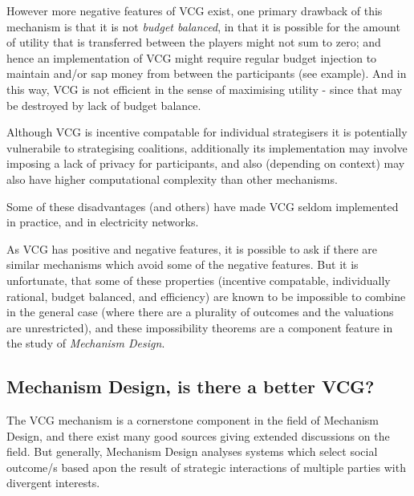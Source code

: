 However more negative features of VCG exist, one primary drawback of this mechanism is that it is not \textit{budget balanced}, in that it is possible for the amount of utility that is transferred between the players might not sum to zero; and hence an implementation of VCG might require regular budget injection to maintain and/or sap money from between the participants (see example).
And in this way, VCG is not efficient in the sense of maximising utility - since that may be destroyed by lack of budget balance.

Although VCG is incentive compatable for individual strategisers it is potentially vulnerabile to strategising coalitions, additionally its implementation may involve imposing a lack of privacy for participants, and also (depending on context) may also have higher computational complexity than other mechanisms.\cite{ShohamLeytonBrown09}

Some of these disadvantages (and others) have made VCG seldom implemented in practice, and in electricity networks.\cite{Rothkopf07, Ausubel2006}

As VCG has positive and negative features, it is possible to ask if there are similar mechanisms which avoid some of the negative features.
But it is unfortunate, that some of these properties (incentive compatable, individually rational, budget balanced, and efficiency) are known to be impossible to combine in the general case (where there are a plurality of outcomes and the valuations are unrestricted), and these impossibility theorems are a component feature in the study of \textit{Mechanism Design}.%

\subsection{Mechanism Design, is there a better VCG?}

The VCG mechanism is a cornerstone component in the field of Mechanism Design, and there exist many good sources giving extended discussions on the field.\cite{37377}
But generally, Mechanism Design analyses systems which select social outcome/s based apon the result of strategic interactions of multiple parties with divergent interests.%

